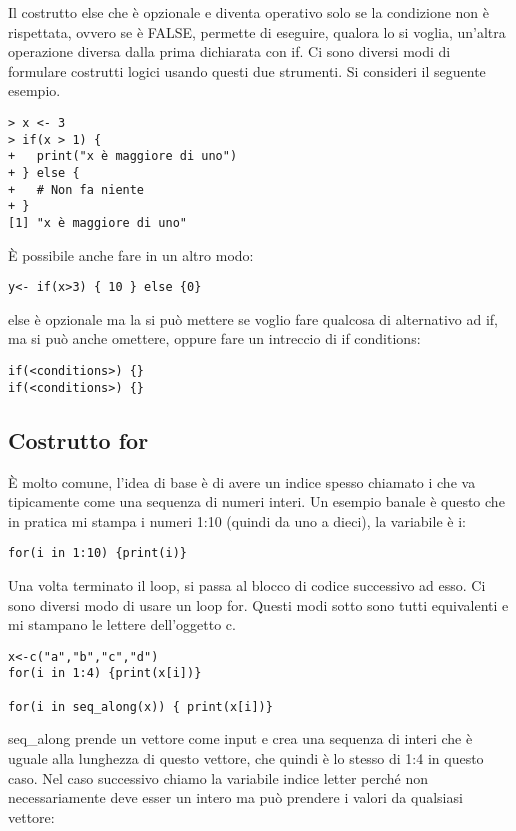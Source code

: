 Il costrutto \textsf{else} che è opzionale e diventa operativo solo se la condizione non è rispettata, ovvero se è \textsf{FALSE}, permette di eseguire, qualora lo si voglia, un'altra operazione diversa dalla prima dichiarata con \textsf{if}. Ci sono diversi modi di formulare costrutti logici usando questi due strumenti.
Si consideri il seguente esempio.

\begin{lstlisting}
> x <- 3
> if(x > 1) {
+ 	print("x è maggiore di uno")
+ } else {
+ 	# Non fa niente
+ }
[1] "x è maggiore di uno"
\end{lstlisting}
È possibile anche fare in un altro modo:
\begin{lstlisting}
y<- if(x>3) { 10 } else {0}
\end{lstlisting}

else è opzionale ma la si può mettere se voglio fare qualcosa di alternativo ad if, ma si può anche omettere, oppure fare un intreccio
di if conditions:
\begin{lstlisting}
if(<conditions>) {}
if(<conditions>) {}
\end{lstlisting}

\subsection{Costrutto for}

È molto comune, l'idea di base è di avere un indice spesso chiamato i che va tipicamente
come una sequenza di numeri interi.
Un esempio banale è questo che in pratica mi stampa i numeri 1:10
(quindi da uno a dieci), la variabile è i:

\begin{lstlisting}
for(i in 1:10) {print(i)}
\end{lstlisting}

Una volta terminato il loop, si passa al blocco di codice successivo ad esso.
Ci sono diversi modo di usare un loop for.
Questi modi sotto sono tutti equivalenti e mi stampano le lettere dell'oggetto c.

\begin{lstlisting}
x<-c("a","b","c","d")
for(i in 1:4) {print(x[i])}

for(i in seq_along(x)) { print(x[i])} 
\end{lstlisting}

seq\_along prende un vettore come input e crea una sequenza di interi
che è uguale alla lunghezza di questo vettore, che quindi è lo stesso di 1:4 in questo caso.
Nel caso successivo chiamo la variabile indice letter perché non necessariamente deve esser un intero ma può prendere i valori da qualsiasi vettore:

